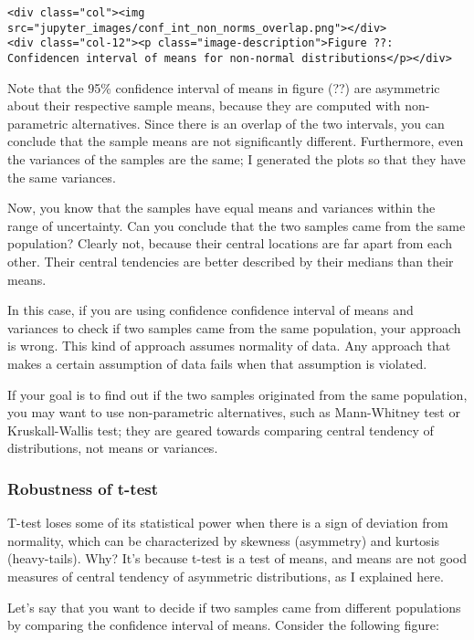 \documentclass[11pt]{article}
\begin{document}
\begin{verbatim}
<div class="col"><img src="jupyter_images/conf_int_non_norms_overlap.png"></div>
<div class="col-12"><p class="image-description">Figure ??: Confidencen interval of means for non-normal distributions</p></div>
\end{verbatim}

Note that the {95\% confidence interval of means} in figure (??) are
asymmetric about their respective sample means, because they are
computed with non-parametric alternatives. Since there is an overlap of
the two intervals, you can conclude that the sample means are not
significantly different. Furthermore, even the variances of the samples
are the same; I generated the plots so that they have the same
variances.

Now, you know that the samples have equal means and variances within the
range of uncertainty. Can you conclude that the two samples came from
the same population? Clearly not, because their central locations are
far apart from each other. Their central tendencies are better described
by their medians than their means.

In this case, if you are using confidence confidence interval of means
and variances to check if two samples came from the same population,
your approach is wrong. This kind of approach assumes normality of data.
Any approach that makes a certain assumption of data fails when that
assumption is violated.

If your goal is to find out if the two samples originated from the same
population, you may want to use non-parametric alternatives, such as
Mann-Whitney test or Kruskall-Wallis test; they are geared towards
comparing central tendency of distributions, not means or variances.

    \subsubsection{Robustness of t-test}\label{robustness-of-t-test}

T-test loses some of its statistical power when there is a sign of
deviation from normality, which can be characterized by skewness
(asymmetry) and kurtosis (heavy-tails). Why? It's because t-test is a
test of means, and means are not good measures of central tendency of
asymmetric distributions, as I explained here.

Let's say that you want to decide if two samples came from different
populations by comparing the confidence interval of means. Consider the
following figure:
\end{document}
